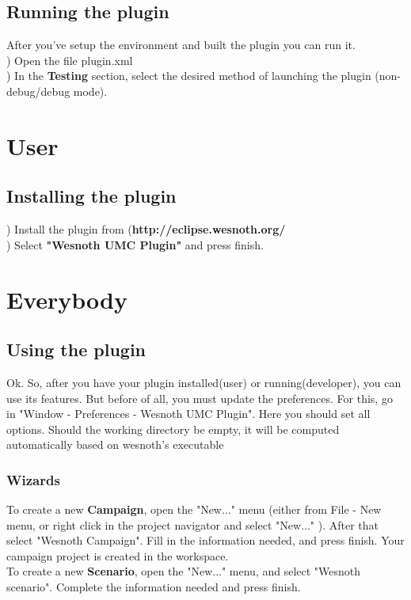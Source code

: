 \documentclass[10pt]{article}
\begin{document}
\subsection{Running the plugin}
After you've setup the environment and built the plugin you can run it. \\
\setcounter{cnt}{0}
\icnt) Open the file plugin.xml \\
\icnt) In the {\bf Testing} section, select the desired method of launching the plugin 
(non-debug/debug mode).

\section{User}
\subsection{Installing the plugin}
\setcounter{cnt}{0}
\icnt) Install the plugin from ({\bf http://eclipse.wesnoth.org/ } \\
\icnt) Select {\bf "Wesnoth UMC Plugin"} and press finish.

\section{Everybody}
\subsection{Using the plugin}
Ok. So, after you have your plugin installed(user) or running(developer), you can use its features. 
But before of all, you must update the preferences. For this, go in "Window - Preferences - Wesnoth UMC Plugin".
Here you should set all options. Should the working directory be empty, it will be computed automatically 
based on wesnoth's executable

\subsubsection{Wizards}
To create a new {\bf Campaign}, open the "New..." menu (either from File - New menu, or right click in the 
project navigator and select "New..." ). After that select "Wesnoth Campaign". Fill in the information needed,
and press finish. Your campaign project is created in the workspace. \\
To create a new {\bf Scenario}, open the "New..." menu, and select "Wesnoth scenario". 
Complete the information needed and press finish.
\end{document}
